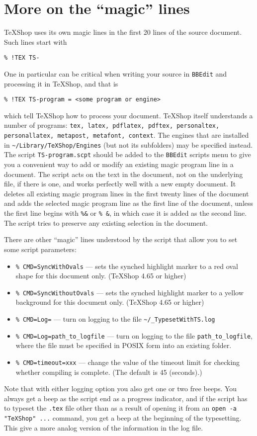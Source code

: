 \documentclass[11pt]{amsart}
\def\TeXShop{\TeX Shop\xspace}
\begin{document}
\section{More on the ``magic'' lines}
\TeXShop uses its own magic lines in the first 20 lines of the source document. Such lines start with 
\begin{verbatim}
% !TEX TS-
\end{verbatim}
One in particular can be critical when writing your source in {\tt BBEdit} and processing it in \TeXShop, and that is
\begin{verbatim}
% !TEX TS-program = <some program or engine>
\end{verbatim}
which tell \TeXShop how to process your document. \TeXShop itself understands a number of programs: {\tt tex, latex, pdflatex, pdftex, personaltex, personallatex, metapost, metafont, context}. The engines that are installed in \verb|~/Library/TeXShop/Engines| (but not its subfolders) may be specified instead. The script {\tt TS-program.scpt} should be added to the {\tt BBEdit} scripts menu to give you a convenient way to add or modify an existing magic program line in a document. The script acts on the text in the document, not on the underlying file, if there is one, and works perfectly well with a new empty document. It deletes all existing magic program lines in the first twenty lines of the document and adds the selected magic program line as the first line of the document, unless the first line begins with \verb|%&| or \verb|% &|, in which case it is added as the second line. The script tries to preserve any existing selection in the document.

There are other  ``magic'' lines understood by the script that allow you to set some script parameters:
\begin{itemize}
\item\verb|% CMD=SyncWithOvals| --- sets the synched highlight marker to a red oval shape  for this document only. (\TeXShop 4.65 or higher)
\item\verb|% CMD=SyncWithoutOvals| --- sets the synched highlight marker to a yellow background for this document only. (\TeXShop 4.65 or higher)
\item\verb|% CMD=Log=| --- turn on logging to the file \verb|~/_TypesetWithTS.log|
\item\verb|% CMD=Log=path_to_logfile| --- turn on logging to the file \verb|path_to_logfile|, where the file must be specified in POSIX form into an existing folder.
\item\verb|% CMD=timeout=xxx| --- change the value of the timeout limit for checking  whether compiling is complete. (The default is 45 (seconds).)
\end{itemize}
Note that with either logging option you also get one or two free beeps. You always get a beep as the script end as a progress indicator, and if the script has to typeset the {\tt.tex} file other than as a result of opening it from an {\tt open -a "TeXShop" ...} command, you get a beep at the beginning of the typesetting. This give a more analog version of the information in the log file.
\end{document}
